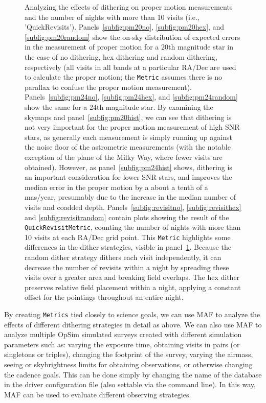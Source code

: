 \documentclass[]{spie}  %
\begin{document}
\begin{figure}
\begin{subfigure}[]{0.3\textwidth}
\caption[]{}
\label{subfig:revisithist}
\end{subfigure}
\caption[]
{\label{fig:dither_pm_revis}
Analyzing the effects of dithering on proper motion measurements and
the number of nights with more than 10 visits (i.e.,
'QuickRevisits'). Panels~\ref{subfig:pm20no}, \ref{subfig:pm20hex},
and \ref{subfig:pm20random} show the on-sky distribution of expected errors in the
measurement of proper motion for a 20th magnitude star in the case of
no dithering, hex dithering and random dithering, respectively (all visits in
all bands at a particular RA/Dec are used to calculate the proper
motion; the {\tt Metric} assumes there is no parallax to confuse the proper
motion measurement). Panels~\ref{subfig:pm24no}, \ref{subfig:pm24hex},
and \ref{subfig:pm24random} show the same for a 24th magnitude
star. By examining the skymaps and panel~\ref{subfig:pm20hist}, we can
see that dithering is not very important for the proper motion
measurement of high SNR stars, as
generally each measurement is simply running up against the noise
floor of the astrometric measurements (with the notable exception of
the plane of the Milky Way, where fewer visits are obtained). However,
as panel~\ref{subfig:pm24hist} shows, dithering is an important
consideration for lower SNR stars, and improves the median error in
the proper motion by a
about a tenth of a mas/year, presumably due to the increase in the
median number of visits and coadded depth. 
Panels~\ref{subfig:revisitno}, \ref{subfig:revisithex} and
\ref{subfig:revisitrandom} contain plots showing the result of the
{\tt QuickRevisitMetric}, counting the number of nights with more than 10
visits at each RA/Dec grid point. This {\tt Metric} highlights some
differences in the dither strategies, visible in
panel~\ref{subfig:revisithist}. Because the random dither strategy
dithers each visit independently, it can decrease the number of
revisits within a night by spreading these visits over a greater area
and breaking field overlaps. The hex dither preserves relative field
placement within a night, applying a constant offset for the pointings
throughout an entire night. 
}
\end{figure}

By creating {\tt Metrics} tied closely to science goals, we can use MAF to
analyze the effects of different dithering strategies in detail as above. We
can also use MAF to analyze multiple OpSim simulated surveys created
with different simulation parameters such as: varying the exposure time, obtaining visits in
pairs (or singletons or triples), changing the footprint of the
survey, varying the airmass, seeing or skybrightness limits for
obtaining observations, or otherwise changing the cadence goals. This
can be done simply by changing the name of the database in the driver
configuration file (also settable via the command line).  In
this way, MAF can be used to evaluate different observing strategies. 
\end{document}

